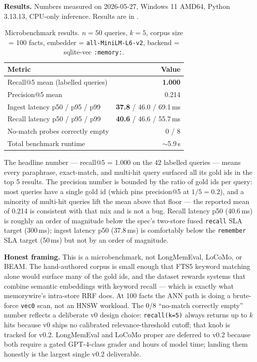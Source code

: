 \documentclass[11pt,letterpaper,twocolumn]{article}
\begin{document}
\textbf{Results.} Numbers measured on 2026-05-27, Windows 11 AMD64, Python 3.13.13, CPU-only inference. Results are in .

\begin{table}[t]
\centering
\caption{Microbenchmark results. $n=50$ queries, $k=5$, corpus size = 100 facts, embedder = \texttt{all-MiniLM-L6-v2}, backend = sqlite-vec \texttt{:memory:}.}
\label{tab:microbench}
\small
\begin{tabular}{lr}
\toprule
\textbf{Metric} & \textbf{Value} \\
\midrule
Recall@5 mean (labelled queries) & \textbf{1.000} \\
Precision@5 mean & 0.214 \\
Ingest latency p50 / p95 / p99 & \textbf{37.8} / 46.0 / 69.1\,ms \\
Recall latency p50 / p95 / p99 & \textbf{40.6} / 46.6 / 55.7\,ms \\
No-match probes correctly empty & 0 / 8 \\
Total benchmark runtime & $\sim$5.9\,s \\
\bottomrule
\end{tabular}
\end{table}

The headline number --- recall@5 = 1.000 on the 42 labelled queries --- means every paraphrase, exact-match, and multi-hit query surfaced all its gold ids in the top 5 results. The precision number is bounded by the ratio of gold ids per query: most queries have a single gold id (which pins precision@5 at $1/5 = 0.2$), and a minority of multi-hit queries lift the mean above that floor --- the reported mean of 0.214 is consistent with that mix and is not a bug. Recall latency p50 (40.6\,ms) is roughly an order of magnitude below the spec's two-store fused \texttt{recall} SLA target (300\,ms); ingest latency p50 (37.8\,ms) is comfortably below the \texttt{remember} SLA target (50\,ms) but not by an order of magnitude.

\textbf{Honest framing.} This is a microbenchmark, not LongMemEval, LoCoMo, or BEAM. The hand-authored corpus is small enough that FTS5 keyword matching alone would surface many of the gold ids, and the dataset rewards systems that combine semantic embeddings with keyword recall --- which is exactly what memorywire's intra-store RRF does. At 100 facts the ANN path is doing a brute-force \texttt{vec0} scan, not an HNSW workload. The 0/8 ``no-match correctly empty'' number reflects a deliberate v0 design choice: \texttt{recall(k=5)} always returns up to $k$ hits because v0 ships no calibrated relevance-threshold cutoff; that knob is tracked for v0.2. LongMemEval and LoCoMo proper are deferred to v0.2 because both require a gated GPT-4-class grader and hours of model time; landing them honestly is the largest single v0.2 deliverable.
\end{document}
